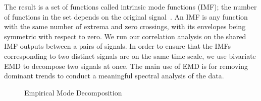 The result is a set of functions called intrinsic mode functions (IMF); the number of functions in 
the set depends on the original signal~\cite{emd_process}.  An IMF is any 
function with the same number of extrema and zero crossings, with its envelopes being symmetric with respect to zero.
We run our correlation analysis on the shared IMF outputs between a pairs of signals.  In order to ensure 
that the IMFs corresponding to two distinct signals are on the same time scale, we use 
bivariate EMD \cite{rilling:biemd2007} to decompose two signals at once. The main use of EMD is for removing dominant trends to conduct a meaningful spectral analysis of the data.

\begin{figure}
 \caption{Empirical Mode Decomposition}
\end{figure}

